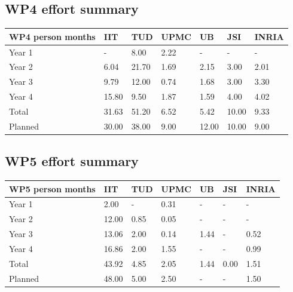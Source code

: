 \documentclass[12pt,a4paper,twoside]{article}
\begin{document}
\subsection{WP4 effort summary}
\begin{center}
\begin{tabular}{|C{1.5cm}|C{1.5cm}|C{1.5cm}|C{2cm}|C{2cm}|C{2cm}|C{2cm}|}
\hline
\footnotesize \textbf{WP4 person months}& \footnotesize \textbf{IIT}&\footnotesize \textbf{TUD}&\footnotesize \textbf{UPMC}& \footnotesize \textbf{UB} &\footnotesize \textbf{JSI} &\footnotesize \textbf{INRIA}\\ \hline
\footnotesize Year 1  &  -        & 8.00   & 2.22 & -       & -        & -     \\  \hline
\footnotesize Year 2  &  6.04  & 21.70 & 1.69 & 2.15 & 3.00   & 2.01     \\  \hline
\footnotesize Year 3  &  9.79  & 12.00 & 0.74 & 1.68 & 3.00   & 3.30 \\  \hline
\footnotesize Year 4  & 15.80 &  9.50 &  1.87 &  1.59  &  4.00  &  4.02    \\  \hline
\footnotesize Total  & 31.63 &  51.20 &  6.52 &  5.42 &  10.00 &  9.33    \\
\hline \hline
\footnotesize Planned & 30.00 & 38.00 & 9.00 & 12.00&10.00 & 9.00 \\ \hline
\end{tabular}
\end{center}

\subsection{WP5 effort summary}
\begin{center}
\begin{tabular}{|C{1.5cm}|C{1.5cm}|C{1.5cm}|C{2cm}|C{2cm}|C{2cm}|C{2cm}|}
\hline
\footnotesize \textbf{WP5 person months}& \footnotesize \textbf{IIT}&\footnotesize \textbf{TUD}&\footnotesize \textbf{UPMC}& \footnotesize \textbf{UB} &\footnotesize \textbf{JSI} & \footnotesize \textbf{INRIA} \\ \hline
\footnotesize Year 1  &  2.00  & -    & 0.31 & -    & - & -     \\  \hline
\footnotesize Year 2  &  12.00 & 0.85 & 0.05 & -    & - & -     \\  \hline
\footnotesize Year 3  &  13.06 & 2.00 & 0.14 & 1.44 & - & 0.52 \\ \hline
\footnotesize Year 4  & 16.86 &  2.00 &  1.55 &  -     &  -     &  0.99 \\   \hline
\footnotesize Total & 43.92 &  4.85 &  2.05 &  1.44 &  0.00 &  1.51    \\
\hline \hline
\footnotesize Planned &  48.00 & 5.00 & 2.50 & - & - & 1.50 \\ \hline
\end{tabular}
\end{center}
\end{document}
